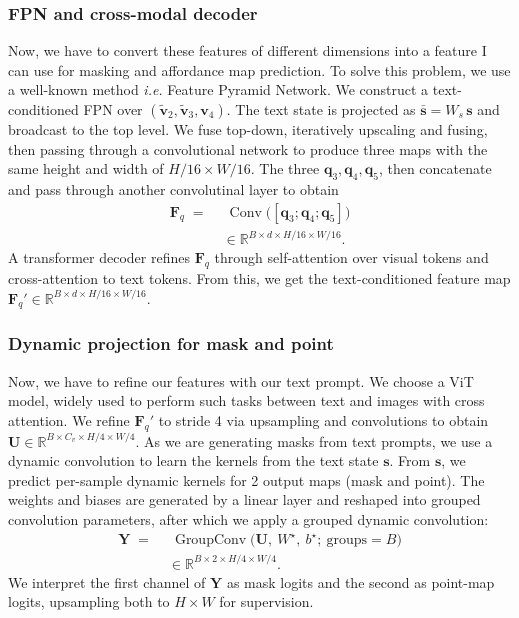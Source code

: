 \subsubsection{FPN and cross-modal decoder}
Now, we have to convert these features of different dimensions into a feature I can use for masking and affordance map prediction. To solve this problem, we use a well-known method \emph{i.e.} Feature Pyramid Network.
We construct a text-conditioned FPN over $(\tilde{\mathbf{v}}_2,\tilde{\mathbf{v}}_3,\mathbf{v}_4)$. The text state is projected as $\bar{\mathbf{s}}=W_s\,\mathbf{s}$ and broadcast to the top level. We fuse top-down, iteratively upscaling and fusing, then passing through a convolutional network to produce three maps  with the same height and width of $H/16 \times W/16$. The three $\mathbf{q}_3,\mathbf{q}_4,\mathbf{q}_5$, then concatenate and pass through another convolutinal layer to obtain
\begin{align*}
\mathbf{F}_q\;=\;
&\ 
    \operatorname{Conv}\big(
        [\mathbf{q}_3;\mathbf{q}_4;\mathbf{q}_5]
    \big)
\\
&\in\mathbb{R}^{B\times d\times H/16\times W/16}.
\end{align*}
A transformer decoder refines $\mathbf{F}_q$ through self-attention over visual tokens and cross-attention to text tokens. From this, we get the text-conditioned feature map $\mathbf{F}_q'\in\mathbb{R}^{B\times d\times H/16\times W/16}$.

\subsubsection{Dynamic projection for mask and point}
Now, we have to refine our features with our text prompt. We choose a ViT model, widely used to perform such tasks between text and images with cross attention. We refine $\mathbf{F}_q'$ to stride 4 via upsampling and convolutions to obtain $\mathbf{U}\in\mathbb{R}^{B\times C_v\times H/4\times W/4}$. 
As we are generating masks from text prompts, we use a dynamic convolution to learn the kernels from the text state $\mathbf{s}$. From $\mathbf{s}$, we predict per-sample dynamic kernels for 2 output maps (mask and point). The weights and biases are generated by a linear layer and reshaped into grouped convolution parameters, after which we apply a grouped dynamic convolution:
\begin{align*}
\mathbf{Y} \;=\;&\ \operatorname{GroupConv}\big(\mathbf{U},\ W^{\star},\ b^{\star};\ \text{groups}{=}B\big) \\
&\in\mathbb{R}^{B\times 2\times H/4\times W/4}.
\end{align*}
We interpret the first channel of $\mathbf{Y}$ as mask logits and the second as point-map logits, upsampling both to $H\times W$ for supervision.

